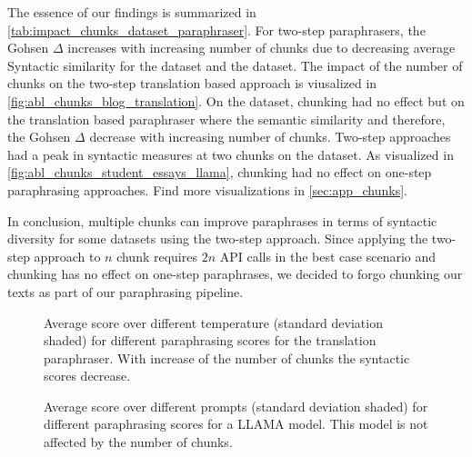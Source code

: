 The essence of our findings is summarized in \autoref{tab:impact_chunks_dataset_paraphraser}.
For two-step paraphrasers, the Gohsen $\Delta$ increases with increasing number of chunks due to decreasing average Syntactic similarity for the \dataBlog{} dataset and the \dataStudent{} dataset.
The impact of the number of chunks on the two-step translation based approach is viusalized in \autoref{fig:abl_chunks_blog_translation}.
On the \dataGutenberg{} dataset, chunking had no effect but on the translation based paraphraser where the semantic similarity and therefore, the Gohsen $\Delta$ decrease with increasing number of chunks.
Two-step approaches had a peak in syntactic measures at two chunks on the \dataPan{} dataset.
As visualized in \autoref{fig:abl_chunks_student_essays_llama}, chunking had no effect on one-step paraphrasing approaches.
Find more visualizations in \autoref{sec:app_chunks}.

In conclusion, multiple chunks can improve paraphrases in terms of syntactic diversity for some datasets using the two-step approach.
Since applying the two-step approach to $n$ chunk requires $2n$ API calls in the best case scenario and chunking has no effect on one-step paraphrases, we decided to forgo chunking our texts as part of our paraphrasing pipeline.

 
\begin{figure}[htbp]
    \centering
    
    \caption{Average score over different temperature (standard deviation shaded) for different paraphrasing scores for the translation paraphraser.
    With increase of the number of chunks the syntactic scores decrease.}
    \label{fig:abl_chunks_blog_translation}
\end{figure}



\begin{figure}[htbp]
    \centering
    
    \caption{Average score over different prompts (standard deviation shaded) for different paraphrasing scores for a LLAMA model. 
    This model is not affected by the number of chunks.}
    \label{fig:abl_chunks_student_essays_llama}
\end{figure}